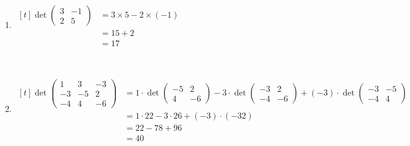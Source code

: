 \documentclass[11pt,fleqn]{book} %
\begin{document}
\begin{enumerate}
    \item 
    $\begin{aligned}[t]
        \det \begin{pmatrix} 3 & -1 \\ 2 & 5 \end{pmatrix} 
        & = 3 \times 5 - 2 \times (-1) \\
        & = 15 + 2                     \\
        & = 17
    \end{aligned}$

    {~~~}

    \item 
    $\begin{aligned}[t]
        \det \begin{pmatrix} 1 & 3 & -3 \\ -3 & -5 & 2 \\ -4 & 4 & -6 \end{pmatrix}
        & = 1 \cdot \det \begin{pmatrix} -5 & 2 \\ 4 & -6 \end{pmatrix} - 3 \cdot \det \begin{pmatrix} -3 & 2 \\ -4 & -6 \end{pmatrix} + (-3) \cdot \det \begin{pmatrix} -3 & -5 \\ -4 & 4 \end{pmatrix} \\
        & = 1 \cdot 22 - 3 \cdot 26 + (-3) \cdot (-32)                  \\
        & = 22 - 78 + 96                                                \\
        & = 40
    \end{aligned}$

    {~~~}


\end{enumerate}
\end{document}
